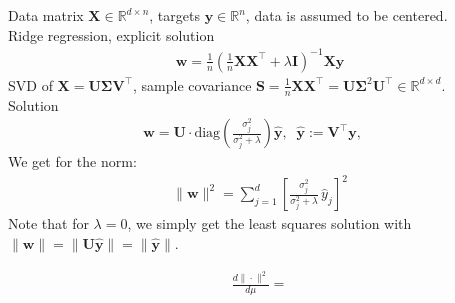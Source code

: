 \documentclass{article}
\renewcommand{\Re}{{\mathbb R}}
\newcommand{\X}{{\mathbf X}}
\newcommand{\Cov}{{\mathbf \Sigma}}
\newcommand{\Covxx}{{\Cov_{xx}}}
\newcommand{\Covxy}{{\mathbf s_{xy}}}
\newcommand{\Covyy}{{s_{yy}}}
\newcommand{\I}{{\mathbf I}}
\newcommand{\w}{{\mathbf w}}
\newcommand{\y}{{\mathbf y}}
\newcommand{\mU}{{\mathbf U}}
\newcommand{\mV}{{\mathbf V}}
\newcommand{\mSigma}{{\mathbf \Sigma}}
\newcommand{\mS}{{\mathbf S}}
\newcommand{\diag}[1]{{\text{diag}\left(#1\right)}}
\newcommand{\E}{\mathbf E}
\begin{document}
\newpage




\newpage


\noindent Data matrix $\X \in \Re^{d \times n}$, targets $\y \in \Re^n$, data is assumed to be centered. \\
Ridge regression, explicit solution 
\begin{align}
\w = \frac 1n \left( \frac 1n \X \X^\top + \lambda  \I \right)^{-1} \X \y
\end{align}
SVD of $\X = \mU \mSigma \mV^\top$, sample covariance $\mS = \frac 1n \X \X^\top  = \mU \mSigma^2 \mU^\top \in \Re^{d \times d}$.\\ Solution  
\begin{align}
\w = \mU \cdot \text{diag}\left( \frac{\sigma_j^2}{\sigma_j^2 + \lambda} \right) \hat \y, \;\; \hat \y := \mV^\top \y, \quad 
\end{align}
We get for the norm: 
\begin{align}
\| \w\|^2 = \sum_{j=1}^d \left[ \frac{\sigma_j^2}{\sigma_j^2 + \lambda} \, \hat y_j \right]^2
\end{align}
Note that for $\lambda=0$, we simply get the least squares solution with $\|\w\| = \| \mU\hat \y\| = \| \hat \y\|$.
\newpage

\begin{align}
\frac{d\| \cdot \|^2}{d\mu} = 
\end{align}
\end{document}
